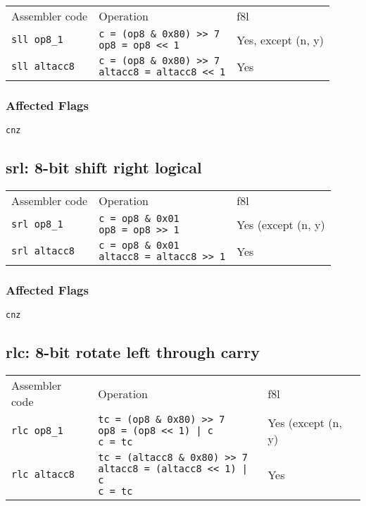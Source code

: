 \documentclass{book}
\begin{document}
\begin{tabular}{l l l}
Assembler code       & Operation                                                                   & f8l \\
\texttt{sll op8\_1}  & \makecell{\texttt{c = (op8 \& 0x80) >> 7}\\\texttt{op8 = op8 << 1}}         & Yes, except (n, y) \\
\texttt{sll altacc8} & \makecell{\texttt{c = (op8 \& 0x80) >> 7}\\\texttt{altacc8 = altacc8 << 1}} & Yes
\end{tabular}

\subsubsection*{Affected Flags}

\texttt{cnz}


\subsection{srl: 8-bit shift right logical}

\begin{tabular}{l l l}
Assembler code       & Operation                                                            & f8l \\
\texttt{srl op8\_1}  & \makecell{\texttt{c = op8 \& 0x01}\\\texttt{op8 = op8 >> 1}}         & Yes (except (n, y) \\
\texttt{srl altacc8} & \makecell{\texttt{c = op8 \& 0x01}\\\texttt{altacc8 = altacc8 >> 1}} & Yes
\end{tabular}

\subsubsection*{Affected Flags}

\texttt{cnz}


\subsection{rlc: 8-bit rotate left through carry}

\begin{tabular}{l l l}
Assembler code       & Operation                                                                                               & f8l \\
\texttt{rlc op8\_1}  & \makecell{\texttt{tc = (op8  \& 0x80) >> 7}\\\texttt{op8 = (op8 << 1) | c}\\\texttt{c = tc}}            & Yes (except (n, y) \\
\texttt{rlc altacc8} & \makecell{\texttt{tc = (altacc8 \& 0x80) >> 7}\\\texttt{altacc8 = (altacc8 << 1) | c}\\\texttt{c = tc}} & Yes
\end{tabular}
\end{document}
